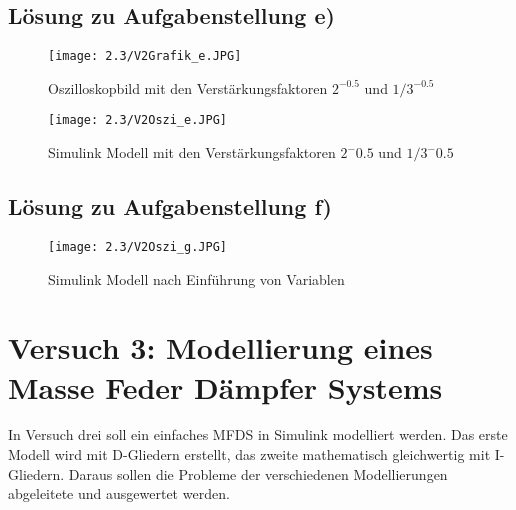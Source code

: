\documentclass[12pt,a4paper]{scrartcl}	%
\begin{document}
\subsection{Lösung zu  Aufgabenstellung e)\grqq}
\begin{figure}[thb]
	\centering
	\texttt{[image: 2.3/V2Grafik\_e.JPG]}
	\caption{Oszilloskopbild mit den Verstärkungsfaktoren $2^{-0.5}$ und $1/3^{-0.5}$} 
\end{figure}
\begin{figure}[bht]
	\centering
	\texttt{[image: 2.3/V2Oszi\_e.JPG]}
	\caption{Simulink Modell mit den Verstärkungsfaktoren $2^-0.5$ und $1/3^-0.5$} 
\end{figure}
\clearpage
\subsection{Lösung zu  Aufgabenstellung f)\grqq}
\begin{figure}[bht]
	\centering
	\texttt{[image: 2.3/V2Oszi\_g.JPG]}
	\caption{Simulink Modell nach Einführung von Variablen} 
\end{figure}
\begin{figure}[bht]
	\centering
	\end{figure}
\clearpage
\section{Versuch 3: Modellierung eines Masse Feder Dämpfer Systems}
In Versuch drei soll ein einfaches MFDS in Simulink modelliert werden. Das erste Modell wird mit D-Gliedern erstellt, das zweite mathematisch gleichwertig mit I-Gliedern. Daraus sollen die Probleme der verschiedenen Modellierungen abgeleitete und ausgewertet werden.
\end{document}
